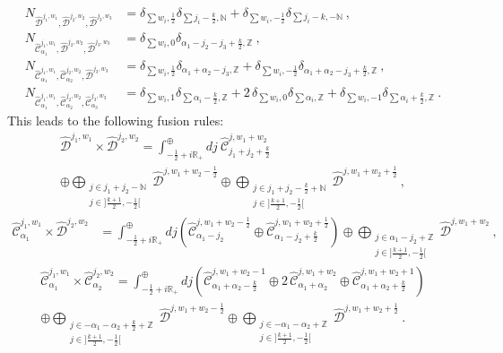 \documentclass[12pt, a4paper, notitlepage, twoside]{report}
\numberwithin{equation}{section}
\theoremstyle{break}
\begin{document}
\begin{align}
 N_{\hat{\mathcal{D}}^{j_1,w_1},\hat{\mathcal{D}}^{j_2,w_2},\hat{\mathcal{D}}^{j_3,w_3}} 
&= \delta_{\sum w_i,\frac12} \delta_{\sum j_i-\frac{k}{2},{\mathbb{N}}} + \delta_{\sum w_i,-\frac12}\delta_{\sum j_i-k,-{\mathbb{N}}} \ ,
\\
 N_{\hat{\mathcal{C}}^{j_1,w_1}_{\alpha_1},\hat{\mathcal{D}}^{j_2,w_2},\hat{\mathcal{D}}^{j_3,w_3}} &= \delta_{\sum w_i,0} \delta_{\alpha_1-j_2-j_3+\frac{k}{2},{\mathbb{Z}}}\ ,
\\
 N_{\hat{\mathcal{C}}^{j_1,w_1}_{\alpha_1},\hat{\mathcal{C}}^{j_2,w_2}_{\alpha_2},\hat{\mathcal{D}}^{j_3,w_3}} & = \delta_{\sum w_i,\frac12} \delta_{\alpha_1+\alpha_2-j_3,{\mathbb{Z}}} + \delta_{\sum w_i,-\frac12}\delta_{\alpha_1+\alpha_2-j_3+\frac{k}{2},{\mathbb{Z}}}\ ,
\\
N_{\hat{\mathcal{C}}^{j_1,w_1}_{\alpha_1},\hat{\mathcal{C}}^{j_2,w_2}_{\alpha_2},\hat{\mathcal{C}}^{j_3,w_3}_{\alpha_3}} & = \delta_{\sum w_i,1}\delta_{\sum\alpha_i-\frac{k}{2},{\mathbb{Z}}} + 2\, \delta_{\sum w_i,0}\delta_{\sum \alpha_i,{\mathbb{Z}}} + \delta_{\sum w_i,-1}\delta_{\sum\alpha_i+\frac{k}{2},{\mathbb{Z}}}\ .
\end{align}
This leads to the following fusion rules:
\begin{multline}
\hat{\mathcal{D}}^{j_1,w_1}\times \hat{\mathcal{D}}^{j_2,w_2} = \int^\oplus_{-\frac12+i{\mathbb{R}}_+} dj\ \hat{\mathcal{C}}^{j,w_1+w_2}_{j_1+j_2+\frac{k}{2}} 
\\ \oplus 
\bigoplus_{\substack{j\in j_1+j_2-{\mathbb{N}} \\ j\in ]\frac{k+1}{2}, -\frac12[}} \hat{\mathcal{D}}^{j,w_1+w_2-\frac12} \oplus 
\bigoplus_{\substack{j\in j_1+j_2-\frac{k}{2}+{\mathbb{N}} \\ j\in ]\frac{k+1}{2}, -\frac12[}} \hat{\mathcal{D}}^{j,w_1+w_2+\frac12}\ ,
\end{multline}
\begin{align}
 \hat{\mathcal{C}}^{j_1,w_1}_{\alpha_1}\times \hat{\mathcal{D}}^{j_2,w_2} &= \int^\oplus_{-\frac12+i{\mathbb{R}}_+} dj\left( \hat{\mathcal{C}}^{j,w_1+w_2-\frac12}_{\alpha_1-j_2} \oplus \hat{\mathcal{C}}^{j,w_1+w_2+\frac12}_{\alpha_1-j_2+\frac{k}{2}}\right) \oplus \bigoplus_{\substack{j\in \alpha_1-j_2+{\mathbb{Z}} \\ j\in ]\frac{k+1}{2}, -\frac12[}} \hat{\mathcal{D}}^{j,w_1+w_2}\ ,
\end{align}
\begin{multline}
 \hat{\mathcal{C}}^{j_1,w_1}_{\alpha_1}\times \hat{\mathcal{C}}^{j_2,w_2}_{\alpha_2} = \int^\oplus_{-\frac12+i{\mathbb{R}}_+} dj \left(\hat{\mathcal{C}}^{j,w_1+w_2-1}_{\alpha_1+\alpha_2-\frac{k}{2}} \oplus 2\, \hat{\mathcal{C}}^{j,w_1+w_2}_{\alpha_1+\alpha_2} \oplus \hat{\mathcal{C}}^{j,w_1+w_2+1}_{\alpha_1+\alpha_2+\frac{k}{2}}\right) 
\\
\oplus \bigoplus_{\substack{j\in -\alpha_1-\alpha_2+\frac{k}{2}+{\mathbb{Z}} \\ j\in]\frac{k+1}{2}, -\frac12[}} \hat{\mathcal{D}}^{j,w_1+w_2-\frac12} 
\oplus \bigoplus_{\substack{j\in -\alpha_1-\alpha_2+{\mathbb{Z}} \\ j\in]\frac{k+1}{2}, -\frac12[}} \hat{\mathcal{D}}^{j,w_1+w_2+\frac12} \ .
\end{multline}
\end{document}
